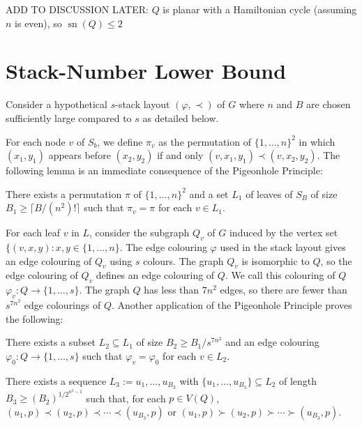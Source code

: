 \documentclass[kpfonts]{patmorin}
\DeclareMathOperator{\sn}{sn}
\renewcommand{\leq}{\leqslant}
\renewcommand{\ge}{\geqslant}
\begin{document}
ADD TO DISCUSSION LATER:	$Q$ is planar with a Hamiltonian cycle (assuming $n$ is even), so $\sn(Q) \leq 2$


\section{Stack-Number Lower Bound}

Consider a hypothetical $s$-stack layout $(\varphi,\prec)$ of $G$ where $n$ and $B$ are chosen sufficiently large compared to $s$ as detailed below. 

For each node $v$ of $S_b$, we define $\pi_v$ as the permutation of $\{1,\ldots,n\}^2$ in which $(x_1,y_1)$ appears before $(x_2,y_2)$ if and only $(v,x_1,y_1)\prec (v,x_2,y_2)$.  The following lemma is an immediate consequence of the Pigeonhole Principle:

\begin{lem}
    There exists a permutation $\pi$ of $\{1,\ldots,n\}^2$ and a set $L_1$ of leaves of $S_B$ of size $B_1\ge \lceil B/(n^2)!\rceil$ such that $\pi_{v}=\pi$ for each $v\in L_1$.
\end{lem}

For each leaf $v$ in $L$, consider the subgraph $Q_v$ of $G$ induced by the vertex set $\{(v,x,y):x,y\in\{1,\ldots,n\}$.  The edge colouring $\varphi$ used in the stack layout gives an edge colouring of $Q_v$ using $s$ colours.  The graph $Q_v$ is isomorphic to $Q$, so the edge colouring of $Q_v$ defines an edge colouring of $Q$.  We call this colouring of $Q$ $\varphi_v:Q\to\{1,\ldots,s\}$.  The graph $Q$ has less than $7n^2$ edges, so there are fewer than $s^{7n^2}$ edge colourings of $Q$.  Another application of the Pigeonhole Principle proves the following:

\begin{lem}
    There exists a subset $L_2\subseteq L_1$ of size $B_2\ge B_1/s^{7n^2}$
    and an edge colouring $\varphi_0:Q\to\{1,\ldots,s\}$ such that $\varphi_v=\varphi_0$ for each $v\in L_2$.
\end{lem}



\begin{lem}
    There exists a sequence $L_3:=u_1,\ldots,u_{B_3}$ with $\{u_1,\ldots,u_{B_3}\}\subseteq L_2$ of length $B_3\ge (B_2)^{1/2^{n^2-1}}$ such that, for each $p\in V(Q)$, $(u_1,p)\prec (u_2,p)\prec\cdots\prec (u_{B_3},p)$ or $(u_1,p)\succ (u_2,p)\succ\cdots\succ (u_{B_3},p)$.
\end{lem}
\end{document}

